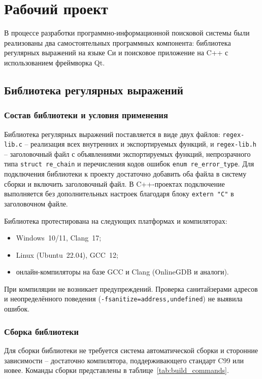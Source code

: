\section{Рабочий проект}

В процессе разработки программно-информационной поисковой системы были реализованы два самостоятельных программных компонента: библиотека регулярных выражений на языке Си и поисковое приложение на C++ с использованием фреймворка Qt.

\subsection{Библиотека регулярных выражений}

\subsubsection{Состав библиотеки и условия применения}

Библиотека регулярных выражений поставляется в виде двух файлов:
\verb`regex-lib.c` -- реализация всех внутренних и экспортируемых
функций, и \verb`regex-lib.h` -- заголовочный файл с объявлениями
экспортируемых функций, непрозрачного типа \verb`struct re_chain`
и перечисления кодов ошибок \verb`enum re_error_type`. Для подключения
библиотеки к проекту достаточно добавить оба файла в систему сборки
и включить заголовочный файл. В C++-проектах подключение выполняется
без дополнительных настроек благодаря блоку \verb`extern "C"`
в заголовочном файле.

Библиотека протестирована на следующих платформах и компиляторах:
\begin{itemize}
	\item Windows~10/11, Clang~17;
	\item Linux (Ubuntu~22.04), GCC~12;
	\item онлайн-компиляторы на базе GCC и Clang (OnlineGDB и аналоги).
\end{itemize}

При компиляции не возникает предупреждений. Проверка санитайзерами
адресов и неопределённого поведения (\verb`-fsanitize=address,undefined`)
не выявила ошибок.

\subsubsection{Сборка библиотеки}

Для сборки библиотеки не требуется система автоматической сборки
и сторонние зависимости -- достаточно компилятора, поддерживающего
стандарт C99 или новее. Команды сборки представлены
в таблице~\ref{tab:build_commands}.

